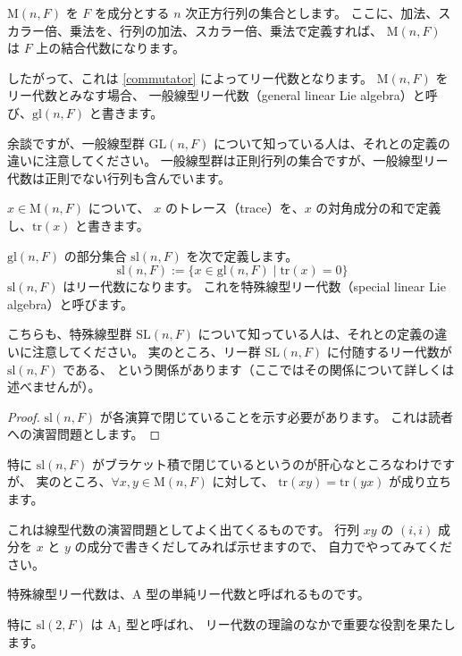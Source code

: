 \documentclass{ltjsarticle}
\begin{document}
\begin{example}[一般線型リー代数]
    $\mathrm{M}(n,F)$ を $F$ を成分とする $n$ 次正方行列の集合とします。
    ここに、加法、スカラー倍、乗法を、行列の加法、スカラー倍、乗法で定義すれば、
    $\mathrm{M}(n,F)$ は $F$ 上の結合代数になります。

    したがって、これは \cref{commutator} によってリー代数となります。
    $\mathrm{M}(n,F)$ をリー代数とみなす場合、
    一般線型リー代数（general linear Lie algebra）と呼び、$\mathrm{gl}(n,F)$ と書きます。
\end{example}

余談ですが、一般線型群 $\mathrm{GL}(n,F)$ について知っている人は、それとの定義の違いに注意してください。
一般線型群は正則行列の集合ですが、一般線型リー代数は正則でない行列も含んでいます。

\begin{definition}[行列のトレース]
    $x \in \mathrm{M}(n,F)$ について、
    $x$ のトレース（trace）を、$x$ の対角成分の和で定義し、$\mathrm{tr}(x)$ と書きます。
\end{definition}

\begin{example}[特殊線型リー代数]
    $\mathrm{gl}(n,F)$ の部分集合 $\mathrm{sl}(n,F)$ を次で定義します。
    \[
        \mathrm{sl}(n,F) := \{x \in \mathrm{gl}(n,F) \mid \mathrm{tr}(x) = 0\}
    \]
    $\mathrm{sl}(n,F)$ はリー代数になります。
    これを特殊線型リー代数（special linear Lie algebra）と呼びます。
\end{example}

こちらも、特殊線型群 $\mathrm{SL}(n,F)$ について知っている人は、それとの定義の違いに注意してください。
実のところ、リー群 $\mathrm{SL}(n,F)$ に付随するリー代数が $\mathrm{sl}(n,F)$ である、
という関係があります（ここではその関係について詳しくは述べませんが）。

\begin{proof}
    $\mathrm{sl}(n,F)$ が各演算で閉じていることを示す必要があります。
    これは読者への演習問題とします。
\end{proof}

特に $\mathrm{sl}(n,F)$ がブラケット積で閉じているというのが肝心なところなわけですが、
実のところ、$\forall x,y \in \mathrm{M}(n,F)$ に対して、
$\mathrm{tr}(xy) = \mathrm{tr}(yx)$ が成り立ちます。

これは線型代数の演習問題としてよく出てくるものです。
行列 $xy$ の $(i,i)$ 成分を $x$ と $y$ の成分で書きくだしてみれば示せますので、
自力でやってみてください。

特殊線型リー代数は、$\mathrm{A}$ 型の単純リー代数と呼ばれるものです。

特に $\mathrm{sl}(2,F)$ は $\mathrm{A}_1$ 型と呼ばれ、
リー代数の理論のなかで重要な役割を果たします。
\end{document}
